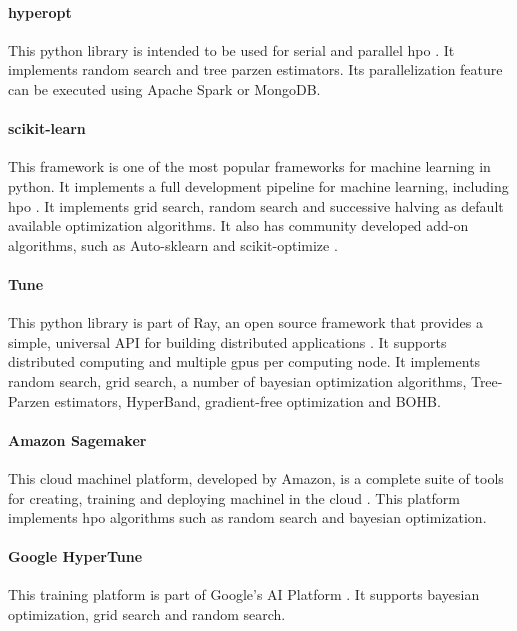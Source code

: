 \paragraph{hyperopt} This \acrshort{python} library is intended to be used for serial and parallel \acrshort{hpo} \parencite{hyperopt, 10.5555/3042817.3042832}. It implements random search and tree parzen estimators. Its parallelization feature can be executed using Apache Spark or MongoDB.

\paragraph{scikit-learn} This framework is one of the most popular frameworks for machine learning in \acrshort{python}. It implements a full development pipeline for machine learning, including \acrshort{hpo} \parencite{scikit-learn}. It implements grid search, random search and successive halving as default available optimization algorithms. It also has community developed add-on algorithms, such as Auto-sklearn \parencite{auto-sklearn} and scikit-optimize \parencite{scikit-optimize}.

\paragraph{Tune} This \acrshort{python} library is part of Ray, an open source framework that provides a simple, universal API for building distributed applications \parencite{ray}. It supports distributed computing and multiple \acrshort{gpu}s per computing node. It implements random search, grid search, a number of bayesian optimization algorithms, Tree-Parzen estimators, HyperBand, gradient-free optimization and BOHB.

\paragraph{Amazon Sagemaker} This cloud \acrshort{machinel} platform, developed by Amazon, is a complete suite of tools for creating, training and deploying \acrshort{machinel} in the cloud \parencite{sagemaker}. This platform implements \acrshort{hpo} algorithms such as random search and bayesian optimization.

\paragraph{Google HyperTune} This training platform is part of Google's AI Platform \parencite{ghypertune}. It supports bayesian optimization, grid search and random search.   


